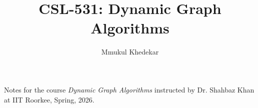 \documentclass[11pt,oneside]{scrartcl}
\title{CSL-531: Dynamic Graph Algorithms}
\author{Mmukul Khedekar}
\begin{document}
\maketitle

\begin{center}
\begin{minipage}{0.7\textwidth}
    \centering
    Notes for the course \emph{Dynamic Graph Algorithms} instructed by Dr. Shahbaz Khan at IIT Roorkee, Spring, 2026.
\end{minipage}
\end{center}

\tableofcontents













\end{document}
